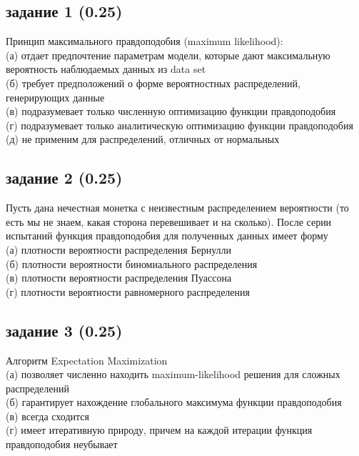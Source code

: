 \documentclass[10pt,a4paper]{article}
\author{Nikolay Anokhin}
\begin{document}
\thispagestyle{empty}

\subsection*{задание 1 (0.25)}

Принцип максимального правдоподобия (maximum likelihood): \\
(а) отдает предпочтение параметрам модели, которые дают максимальную вероятность наблюдаемых данных из data set \\
(б) требует предположений о форме вероятностных распределений, генерирующих данные \\
(в) подразумевает только численную оптимизацию функции правдоподобия \\
(г) подразумевает только аналитическую оптимизацию функции правдоподобия \\
(д) не применим для распределений, отличных от нормальных

\subsection*{задание 2 (0.25)}

Пусть дана нечестная монетка с неизвестным распределением вероятности (то есть мы не знаем, какая сторона перевешивает и на сколько). После серии испытаний функция правдоподобия для полученных данных имеет форму \\
(а) плотности вероятности распределения Бернулли \\
(б) плотности вероятности биномиального распределения \\
(в) плотности вероятности распределения Пуассона \\
(г) плотности вероятности равномерного распределения

\subsection*{задание 3 (0.25)}

Алгоритм Expectation Maximization \\
(а) позволяет численно находить maximum-likelihood решения для сложных распределений \\
(б) гарантирует нахождение глобального максимума функции правдоподобия \\
(в) всегда сходится \\
(г) имеет итеративную природу, причем на каждой итерации функция правдоподобия неубывает
\end{document}
